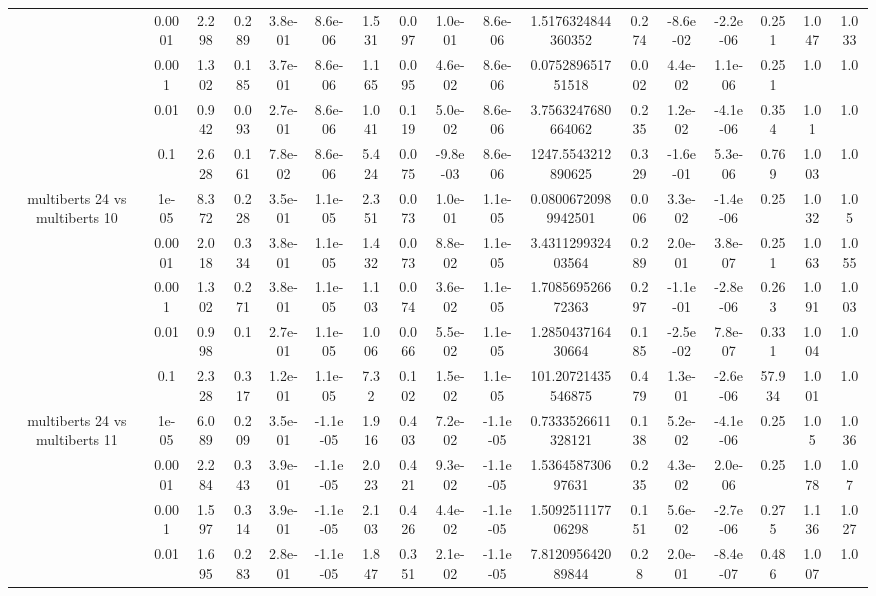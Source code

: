 \begin{tabular}{|c|c|c|c|c|c|c|c|c|c|c|c|c|c|c|c|c|}
 & 0.0001 & 2.298 & 0.289 & 3.8e-01 & 8.6e-06 & 1.531 & 0.097 & 1.0e-01 & 8.6e-06 & 1.5176324844360352 & 0.274 & -8.6e-02 & -2.2e-06 & 0.251 & 1.047 & 1.033 \\
 & 0.001 & 1.302 & 0.185 & 3.7e-01 & 8.6e-06 & 1.165 & 0.095 & 4.6e-02 & 8.6e-06 & 0.075289651751518 & 0.002 & 4.4e-02 & 1.1e-06 & 0.251 & 1.0 & 1.0 \\
 & 0.01 & 0.942 & 0.093 & 2.7e-01 & 8.6e-06 & 1.041 & 0.119 & 5.0e-02 & 8.6e-06 & 3.7563247680664062 & 0.235 & 1.2e-02 & -4.1e-06 & 0.354 & 1.01 & 1.0 \\
 & 0.1 & 2.628 & 0.161 & 7.8e-02 & 8.6e-06 & 5.424 & 0.075 & -9.8e-03 & 8.6e-06 & 1247.5543212890625 & 0.329 & -1.6e-01 & 5.3e-06 & 0.769 & 1.003 & 1.0 \\
\hline
\multirow{5}{*}{multiberts 24 vs multiberts 10} & 1e-05 & 8.372 & 0.228 & 3.5e-01 & 1.1e-05 & 2.351 & 0.073 & 1.0e-01 & 1.1e-05 & 0.08006720989942501 & 0.006 & 3.3e-02 & -1.4e-06 & 0.25 & 1.032 & 1.05 \\
 & 0.0001 & 2.018 & 0.334 & 3.8e-01 & 1.1e-05 & 1.432 & 0.073 & 8.8e-02 & 1.1e-05 & 3.431129932403564 & 0.289 & 2.0e-01 & 3.8e-07 & 0.251 & 1.063 & 1.055 \\
 & 0.001 & 1.302 & 0.271 & 3.8e-01 & 1.1e-05 & 1.103 & 0.074 & 3.6e-02 & 1.1e-05 & 1.708569526672363 & 0.297 & -1.1e-01 & -2.8e-06 & 0.263 & 1.091 & 1.003 \\
 & 0.01 & 0.998 & 0.1 & 2.7e-01 & 1.1e-05 & 1.006 & 0.066 & 5.5e-02 & 1.1e-05 & 1.285043716430664 & 0.185 & -2.5e-02 & 7.8e-07 & 0.331 & 1.004 & 1.0 \\
 & 0.1 & 2.328 & 0.317 & 1.2e-01 & 1.1e-05 & 7.32 & 0.102 & 1.5e-02 & 1.1e-05 & 101.20721435546875 & 0.479 & 1.3e-01 & -2.6e-06 & 57.934 & 1.001 & 1.0 \\
\hline
\multirow{5}{*}{multiberts 24 vs multiberts 11} & 1e-05 & 6.089 & 0.209 & 3.5e-01 & -1.1e-05 & 1.916 & 0.403 & 7.2e-02 & -1.1e-05 & 0.7333526611328121 & 0.138 & 5.2e-02 & -4.1e-06 & 0.25 & 1.05 & 1.036 \\
 & 0.0001 & 2.284 & 0.343 & 3.9e-01 & -1.1e-05 & 2.023 & 0.421 & 9.3e-02 & -1.1e-05 & 1.536458730697631 & 0.235 & 4.3e-02 & 2.0e-06 & 0.25 & 1.078 & 1.07 \\
 & 0.001 & 1.597 & 0.314 & 3.9e-01 & -1.1e-05 & 2.103 & 0.426 & 4.4e-02 & -1.1e-05 & 1.509251117706298 & 0.151 & 5.6e-02 & -2.7e-06 & 0.275 & 1.136 & 1.027 \\
 & 0.01 & 1.695 & 0.283 & 2.8e-01 & -1.1e-05 & 1.847 & 0.351 & 2.1e-02 & -1.1e-05 & 7.812095642089844 & 0.28 & 2.0e-01 & -8.4e-07 & 0.486 & 1.007 & 1.0 \\

\end{tabular}
